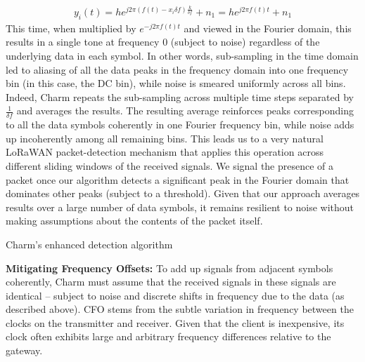 \begin{align}
    y_i\left(t\right) = h e^{j 2 \pi (f(t) - x_i \delta f) \frac{k}{\delta f}} + n_1 = h e^{j 2 \pi f(t) t} + n_1\label{eqn:yi2}
\end{align}
This time, when multiplied by $e^{-j 2 \pi f(t) t}$ and viewed in the Fourier domain, this results in a single tone at frequency $0$ (subject to noise) regardless of the underlying data in each symbol. In other words, sub-sampling in the time domain led to aliasing of all the data peaks in the frequency domain into one frequency bin (in this case, the DC bin), while noise is smeared uniformly across all bins. Indeed, Charm repeats the sub-sampling across multiple time steps separated  by $\frac{1}{\delta f}$ and averages the results. The resulting average reinforces peaks corresponding to all the data symbols coherently in one Fourier frequency bin, while noise adds up incoherently among all remaining bins. This leads us to a very natural LoRaWAN packet-detection mechanism that applies this operation across different sliding windows of the received signals. We signal the presence of a packet once our algorithm detects a significant peak in the Fourier domain that dominates other peaks (subject to a threshold). Given that our approach averages results over a large number of data symbols, it remains resilient to noise without making assumptions about the contents of the packet itself.  

\LinesNumbered
\begin{algorithm}[ht]
\caption{Charm's enhanced detection algorithm}
\label{alg:algorithm-label2}
\end{algorithm}

\noindent \textbf{Mitigating Frequency Offsets: } To add up signals from adjacent symbols coherently, Charm must assume that the received signals in these signals are identical -- subject to noise and discrete shifts in frequency due to the data (as described above).   CFO stems from the subtle variation in frequency between the clocks on the transmitter and receiver. Given that the client is inexpensive, its clock often exhibits large and arbitrary frequency differences relative to the gateway. 

